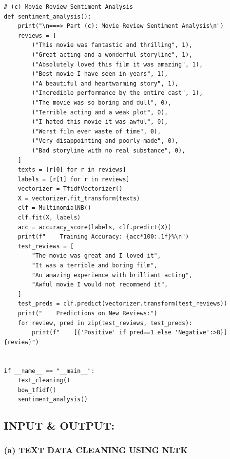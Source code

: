 \documentclass[12pt,a4paper]{article}
\begin{document}
\begin{lstlisting}
# (c) Movie Review Sentiment Analysis
def sentiment_analysis():
    print("\n===> Part (c): Movie Review Sentiment Analysis\n")
    reviews = [
        ("This movie was fantastic and thrilling", 1),
        ("Great acting and a wonderful storyline", 1),
        ("Absolutely loved this film it was amazing", 1),
        ("Best movie I have seen in years", 1),
        ("A beautiful and heartwarming story", 1),
        ("Incredible performance by the entire cast", 1),
        ("The movie was so boring and dull", 0),
        ("Terrible acting and a weak plot", 0),
        ("I hated this movie it was awful", 0),
        ("Worst film ever waste of time", 0),
        ("Very disappointing and poorly made", 0),
        ("Bad storyline with no real substance", 0),
    ]
    texts = [r[0] for r in reviews]
    labels = [r[1] for r in reviews]
    vectorizer = TfidfVectorizer()
    X = vectorizer.fit_transform(texts)
    clf = MultinomialNB()
    clf.fit(X, labels)
    acc = accuracy_score(labels, clf.predict(X))
    print(f"    Training Accuracy: {acc*100:.1f}%\n")
    test_reviews = [
        "The movie was great and I loved it",
        "It was a terrible and boring film",
        "An amazing experience with brilliant acting",
        "Awful movie I would not recommend it",
    ]
    test_preds = clf.predict(vectorizer.transform(test_reviews))
    print("    Predictions on New Reviews:")
    for review, pred in zip(test_reviews, test_preds):
        print(f"    [{'Positive' if pred==1 else 'Negative':>8}] {review}")


if __name__ == "__main__":
    text_cleaning()
    bow_tfidf()
    sentiment_analysis()
\end{lstlisting}

\subsection{INPUT \& OUTPUT:}

\subsubsection*{(a) TEXT DATA CLEANING USING NLTK}
\end{document}
